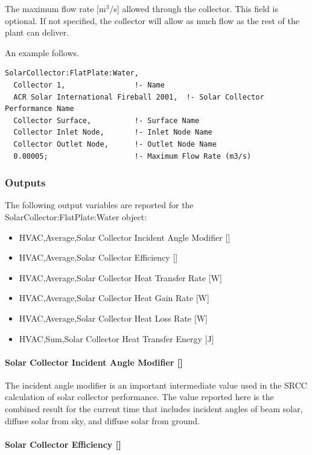 The maximum flow rate {[}m\(^{3}\)/s{]} allowed through the collector. This field is optional. If not specified, the collector will allow as much flow as the rest of the plant can deliver.

An example follows.

\begin{lstlisting}
SolarCollector:FlatPlate:Water,
  Collector 1,                !- Name
  ACR Solar International Fireball 2001,  !- Solar Collector Performance Name
  Collector Surface,          !- Surface Name
  Collector Inlet Node,       !- Inlet Node Name
  Collector Outlet Node,      !- Outlet Node Name
  0.00005;                    !- Maximum Flow Rate (m3/s)
\end{lstlisting}

\subsubsection{Outputs}\label{outputs-034}

The following output variables are reported for the SolarCollector:FlatPlate:Water object:

\begin{itemize}
\item
  HVAC,Average,Solar Collector Incident Angle Modifier {[]}
\item
  HVAC,Average,Solar Collector Efficiency {[]}
\item
  HVAC,Average,Solar Collector Heat Transfer Rate {[}W{]}
\item
  HVAC,Average,Solar Collector Heat Gain Rate {[}W{]}
\item
  HVAC,Average,Solar Collector Heat Loss Rate {[}W{]}
\item
  HVAC,Sum,Solar Collector Heat Transfer Energy {[}J{]}
\end{itemize}

\paragraph{Solar Collector Incident Angle Modifier {[]}}\label{solar-collector-incident-angle-modifier}

The incident angle modifier is an important intermediate value used in the SRCC calculation of solar collector performance. The value reported here is the combined result for the current time that includes incident angles of beam solar, diffuse solar from sky, and diffuse solar from ground.

\paragraph{Solar Collector Efficiency {[]}}\label{solar-collector-efficiency}

